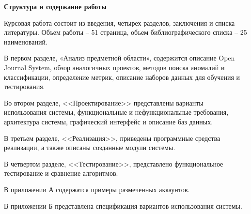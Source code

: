 \textbf{Структура и содержание работы}

Курсовая работа состоит из введения, четырех разделов, заключения и списка литературы. Объем работы -- 51 страница, объем библиографического списка -- 25 наименований.

В первом разделе, «Анализ предметной области», содержится описание Open Journal System, обзор аналогичных проектов, методов поиска аномалий и классификации, определение метрик, описание наборов данных для обучения и тестирования.

Во втором разделе, <<Проектирование>> представлены варианты использования системы, функциональные и нефункциональные требования, архитектура системы, графический интерфейс и описание баз данных.

В третьем разделе, <<Реализация>>, приведены программные средства реализации, а также описаны созданные модули системы.

В четвертом разделе, <<Тестирование>>, представлено функциональное тестирование и сравнение алгоритмов.

В приложении А содержатся примеры размеченных аккаунтов.

В приложении Б представлена спецификация вариантов использования системы.
